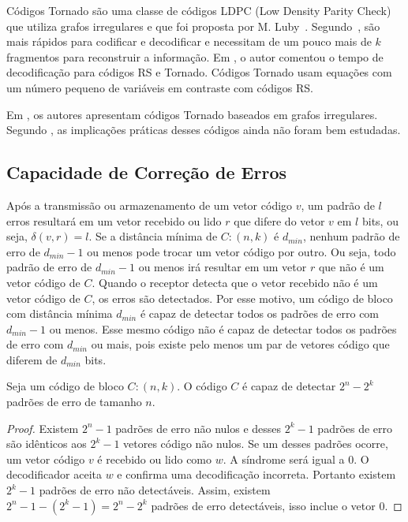 
Códigos Tornado são uma classe de códigos LDPC (Low Density Parity
Check) que utiliza grafos irregulares e que foi proposta por
M. Luby~\cite{Woitaszek:2007}. Segundo~\cite{Kubiatowicz:2000}, são
mais rápidos para codificar e decodificar e necessitam de um pouco
mais de $k$ fragmentos para reconstruir a informação. Em
\cite{Byers:1998}, o autor comentou o tempo de decodificação para
códigos RS e Tornado. Códigos Tornado usam equações com um número
pequeno de variáveis em contraste com códigos RS. 


Em \cite{Luby:1998}, os autores apresentam códigos Tornado baseados em grafos irregulares. Segundo \cite{CS540:2010}, as implicações práticas desses códigos ainda não foram bem estudadas.

\subsection{Capacidade de Correção de Erros}

Após a transmissão ou armazenamento de um vetor código $v$, um padrão de $l$ erros resultará em um vetor recebido ou lido $r$ que difere do vetor $v$ em $l$ bits, ou seja, $\delta(v,r)=l$. Se a distância mínima de $C:(n,k)$ é $d_{min}$, nenhum padrão de erro de $d_{min}-1$ ou menos pode trocar um vetor código por outro. Ou seja, todo padrão de erro de $d_{min}-1$ ou menos irá resultar em um vetor $r$ que não é um vetor código de $C$. Quando o receptor detecta que o vetor recebido não é um vetor código de $C$, os erros são detectados. Por esse motivo, um código de bloco com distância mínima $d_{min}$ é capaz de detectar todos os padrões de erro com $d_{min}-1$ ou menos. Esse mesmo código não é capaz de detectar todos os padrões de erro com $d_{min}$ ou mais, pois existe pelo menos um par de vetores código que diferem de $d_{min}$ bits.

\begin{proposition} Seja um código de bloco $C:(n,k)$. O código $C$ é capaz de detectar $2^n - 2^k$ padrões de erro de tamanho $n$.
\end{proposition}

\begin{proof} Existem $2^n -1$ padrões de erro não nulos e desses $2^k-1$ padrões de erro são idênticos aos $2^k-1$ vetores código não nulos. Se um desses padrões ocorre, um vetor código $v$ é recebido ou lido como $w$. A síndrome será igual a $0$. O decodificador aceita $w$ e confirma uma decodificação incorreta. Portanto existem $2^k-1$ padrões de erro não detectáveis. Assim, existem $2^n -1 - (2^k-1)=2^n - 2^k$ padrões de erro detectáveis, isso inclue o vetor $0$.
\end{proof}

